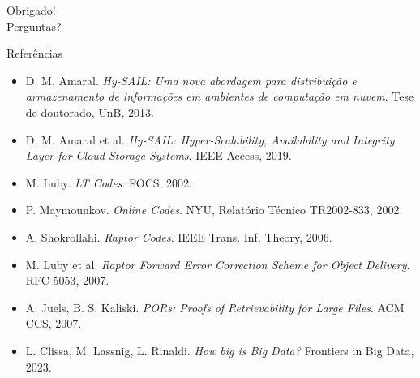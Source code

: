 \documentclass[aspectratio=169,10pt]{beamer}
\begin{document}
\begin{frame}[standout]
	Obrigado!\\[1em]
	{\normalsize Perguntas?}
\end{frame}

\appendix

\begin{frame}{Referências}
	\footnotesize
	\begin{itemize}\setlength{\itemsep}{0.5em}
		\item D. M. Amaral. \emph{Hy-SAIL: Uma nova abordagem para distribuição e armazenamento de informações em ambientes de computação em nuvem}. Tese de doutorado, UnB, 2013.
		\item D. M. Amaral et al. \emph{Hy-SAIL: Hyper-Scalability, Availability and Integrity Layer for Cloud Storage Systems}. IEEE Access, 2019.
		\item M. Luby. \emph{LT Codes}. FOCS, 2002.
		\item P. Maymounkov. \emph{Online Codes}. NYU, Relatório Técnico TR2002-833, 2002.
		\item A. Shokrollahi. \emph{Raptor Codes}. IEEE Trans. Inf. Theory, 2006.
		\item M. Luby et al. \emph{Raptor Forward Error Correction Scheme for Object Delivery}. RFC 5053, 2007.
		\item A. Juels, B. S. Kaliski. \emph{PORs: Proofs of Retrievability for Large Files}. ACM CCS, 2007.
		\item L. Clissa, M. Lassnig, L. Rinaldi. \emph{How big is Big Data?} Frontiers in Big Data, 2023.
	\end{itemize}
\end{frame}
\end{document}

